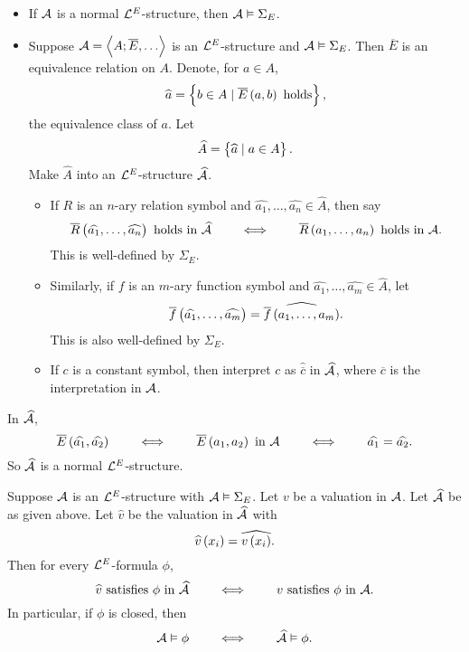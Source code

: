 \begin{remark}
\hfill
\begin{itemize}
\item If $ \AA $ is a normal $ \LL^E $-structure, then $ \AA \vDash \Sigma_E $.
\item Suppose $ \AA = \abr{A; \overline{E}, \dots} $ is an $ \LL^E $-structure and $ \AA \vDash \Sigma_E $. Then $ \overline{E} $ is an equivalence relation on $ A $. Denote, for $ a \in A $,
$$ \widehat{a} = \cbr{b \in A \mid \overline{E}\br{a, b} \ \text{holds}}, $$
the equivalence class of $ a $. Let
$$ \widehat{A} = \cbr{\widehat{a} \mid a \in A}. $$
Make $ \widehat{A} $ into an $ \LL^E $-structure $ \widehat{\AA} $.
\begin{itemize}
\item If $ R $ is an $ n $-ary relation symbol and $ \widehat{a_1}, \dots, \widehat{a_n} \in \widehat{A} $, then say
$$ \overline{R}\br{\widehat{a_1}, \dots, \widehat{a_n}} \ \text{holds in} \ \widehat{\AA} \qquad \iff \qquad \overline{R}\br{a_1, \dots, a_n} \ \text{holds in} \ \AA. $$
This is well-defined by $ \Sigma_E $.
\item Similarly, if $ f $ is an $ m $-ary function symbol and $ \widehat{a_1}, \dots, \widehat{a_m} \in \widehat{A} $, let
$$ \overline{f}\br{\widehat{a_1}, \dots, \widehat{a_m}} = \widehat{\overline{f}\br{a_1, \dots, a_m}}. $$
This is also well-defined by $ \Sigma_E $.
\item If $ c $ is a constant symbol, then interpret $ c $ as $ \widehat{\overline{c}} $ in $ \widehat{\AA} $, where $ \overline{c} $ is the interpretation in $ \AA $.
\end{itemize}
\end{itemize}
\end{remark}

\begin{note*}
In $ \widehat{\AA} $,
$$ \overline{E}\br{\widehat{a_1}, \widehat{a_2}} \qquad \iff \qquad \overline{E}\br{a_1, a_2} \ \text{in} \ \AA \qquad \iff \qquad \widehat{a_1} = \widehat{a_2}. $$
So $ \widehat{\AA} $ is a normal $ \LL^E $-structure.
\end{note*}

\begin{lemma}
\label{lem:2.6.3}
Suppose $ \AA $ is an $ \LL^E $-structure with $ \AA \vDash \Sigma_E $. Let $ v $ be a valuation in $ \AA $. Let $ \widehat{\AA} $ be as given above. Let $ \widehat{v} $ be the valuation in $ \widehat{\AA} $ with
$$ \widehat{v}\br{x_i} = \widehat{v\br{x_i}}. $$
Then for every $ \LL^E $-formula $ \phi $,
$$ \widehat{v} \ \text{satisfies} \ \phi \ \text{in} \ \widehat{\AA} \qquad \iff \qquad v \ \text{satisfies} \ \phi \ \text{in} \ \AA. $$
In particular, if $ \phi $ is closed, then
$$ \AA \vDash \phi \qquad \iff \qquad \widehat{\AA} \vDash \phi. $$
\end{lemma}

